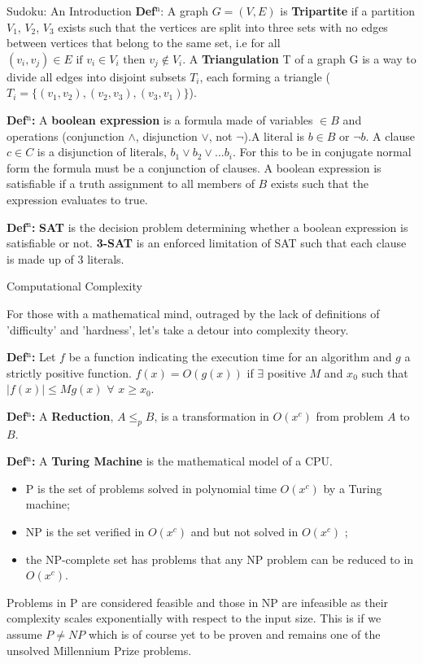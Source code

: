 \documentclass[final]{beamer}
\newlength{\colwidth}
\newcounter{col}
\begin{document}
\begin{frame}[t]
\begin{columns}[t]
\begin{column}{\colwidth}
\begin{exampleblock}{Sudoku: An Introduction}
\textbf{Def$^\text{n}$}: A graph $G=(V,E)$ is \textbf{Tripartite} if a partition $V_1$, $V_2$, $V_3$ exists such that the vertices are split into three sets with no edges between vertices that belong to the same set, i.e for all $(v_i,v_j) \in E\text{ if } v_i \in V_i\text{ then }v_j \not\in V_i $. A \textbf{Triangulation} T of a graph G is a way to divide all edges into disjoint subsets $T_i$, each forming a triangle ($T_i=\{(v_{1}, v_{2}),(v_{2}, v_{3}),(v_{3},v_{1})\}$).

\textbf{Def$^\text{n}$:} A \textbf{boolean expression} is a formula made of variables $\in B$ and operations (conjunction $\land$, disjunction $\lor$, not $\neg$).A literal is $b\in B$ or $\neg b$. A clause $c\in C$ is a disjunction of literals, $b_1 \lor b_2 \lor ... b_i$. For this to be in conjugate normal form the formula must be a conjunction of clauses. A boolean expression is satisfiable if a truth assignment to all members of $B$ exists such that the expression evaluates to true. 

\textbf{Def$^\text{n}$:}  \textbf{SAT} is the decision problem determining whether a boolean expression is satisfiable or not. \textbf{3-SAT} is an enforced limitation of SAT such that each clause is made up of 3 literals. 
  \end{exampleblock}
 \begin{block}{Computational Complexity}

For those with a mathematical mind, outraged by the lack of definitions of 'difficulty' and 'hardness', let's take a detour into complexity theory. 

\textbf{Def$^\text{n}$:} Let $f$ be a function indicating the execution time for an algorithm and $g$ a strictly positive function. $f(x)=O (g(x))$ if $\exists$ positive $ M$ and $x_0$ such that $|f(x)|\leq Mg(x)$ $\forall$ $x\geq x_0$.

\textbf{Def$^\text{n}$:} A \textbf{Reduction}, $A \leq_p B$, is a transformation in $O(x^c)$ from problem $A$ to $B$.

\textbf{Def$^\text{n}$:} A \textbf{Turing Machine} is the mathematical model of a CPU.

 \begin{itemize}
	\item{P is the set of problems solved in polynomial time $O(x^c)$ by a Turing machine;} 
	\item{NP is the set verified in $O(x^c)$ and but not solved in $O(x^c)$ ;} 
	\item{the NP-complete set has problems that any NP problem can be reduced to in $O(x^c)$.} 
\end{itemize}
Problems in P are considered feasible and those in NP are infeasible as their complexity scales exponentially with respect to the input size. This is if we assume $P\neq NP$ which is of course yet to be proven and remains one of the unsolved Millennium Prize problems. 


\end{block}
\end{column}
\end{columns}
\end{frame}
\end{document}
